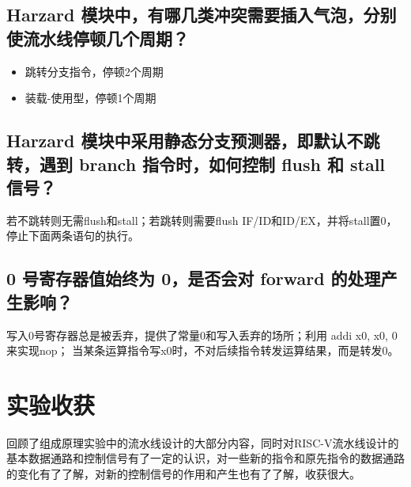 \documentclass[UTF8]{ctexart}
\begin{document}
	\subsection{Harzard 模块中，有哪几类冲突需要插入气泡，分别使流水线停顿几个周期？}
	\begin{itemize}
		\item 跳转分支指令，停顿2个周期
		\item 装载-使用型，停顿1个周期
	\end{itemize}

	\subsection{Harzard 模块中采用静态分支预测器，即默认不跳转，遇到 branch 指令时，如何控制 flush 和 stall 信号？}
	若不跳转则无需flush和stall；若跳转则需要flush IF/ID和ID/EX，并将stall置0，停止下面两条语句的执行。
	\subsection{0 号寄存器值始终为 0，是否会对 forward 的处理产生影响？}
	写入0号寄存器总是被丢弃，提供了常量0和写入丢弃的场所；利用 addi x0, x0, 0来实现nop； 当某条运算指令写x0时，不对后续指令转发运算结果，而是转发0。
	
	\section{实验收获}
	回顾了组成原理实验中的流水线设计的大部分内容，同时对RISC-V流水线设计的基本数据通路和控制信号有了一定的认识，对一些新的指令和原先指令的数据通路的变化有了了解，对新的控制信号的作用和产生也有了了解，收获很大。
\end{document}
